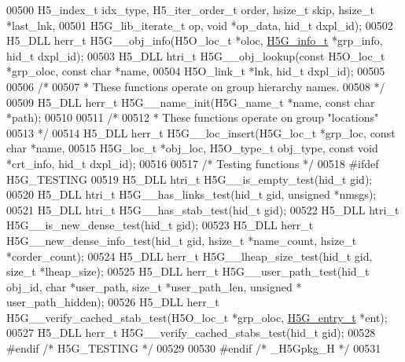 \begin{DoxyCode}
00500     H5\_index\_t idx\_type, H5\_iter\_order\_t order, hsize\_t skip, hsize\_t *last\_lnk,
00501     H5G\_lib\_iterate\_t op, \textcolor{keywordtype}{void} *op\_data, hid\_t dxpl\_id);
00502 H5\_DLL herr\_t H5G\_\_obj\_info(H5O\_loc\_t *oloc, \hyperlink{struct_h5_g__info__t}{H5G\_info\_t} *grp\_info, hid\_t dxpl\_id);
00503 H5\_DLL htri\_t H5G\_\_obj\_lookup(\textcolor{keyword}{const} H5O\_loc\_t *grp\_oloc, \textcolor{keyword}{const} \textcolor{keywordtype}{char} *name,
00504     H5O\_link\_t *lnk, hid\_t dxpl\_id);
00505 
00506 \textcolor{comment}{/*}
00507 \textcolor{comment}{ * These functions operate on group hierarchy names.}
00508 \textcolor{comment}{ */}
00509 H5\_DLL herr\_t H5G\_\_name\_init(H5G\_name\_t *name, \textcolor{keyword}{const} \textcolor{keywordtype}{char} *path);
00510 
00511 \textcolor{comment}{/*}
00512 \textcolor{comment}{ * These functions operate on group "locations"}
00513 \textcolor{comment}{ */}
00514 H5\_DLL herr\_t H5G\_\_loc\_insert(H5G\_loc\_t *grp\_loc, \textcolor{keyword}{const} \textcolor{keywordtype}{char} *name,
00515     H5G\_loc\_t *obj\_loc, H5O\_type\_t obj\_type, \textcolor{keyword}{const} \textcolor{keywordtype}{void} *crt\_info, hid\_t dxpl\_id);
00516 
00517 \textcolor{comment}{/* Testing functions */}
00518 \textcolor{preprocessor}{#ifdef H5G\_TESTING}
00519 H5\_DLL htri\_t H5G\_\_is\_empty\_test(hid\_t gid);
00520 H5\_DLL htri\_t H5G\_\_has\_links\_test(hid\_t gid, \textcolor{keywordtype}{unsigned} *nmsgs);
00521 H5\_DLL htri\_t H5G\_\_has\_stab\_test(hid\_t gid);
00522 H5\_DLL htri\_t H5G\_\_is\_new\_dense\_test(hid\_t gid);
00523 H5\_DLL herr\_t H5G\_\_new\_dense\_info\_test(hid\_t gid, hsize\_t *name\_count, hsize\_t *corder\_count);
00524 H5\_DLL herr\_t H5G\_\_lheap\_size\_test(hid\_t gid, \textcolor{keywordtype}{size\_t} *lheap\_size);
00525 H5\_DLL herr\_t H5G\_\_user\_path\_test(hid\_t obj\_id, \textcolor{keywordtype}{char} *user\_path, \textcolor{keywordtype}{size\_t} *user\_path\_len, \textcolor{keywordtype}{unsigned} *
      user\_path\_hidden);
00526 H5\_DLL herr\_t H5G\_\_verify\_cached\_stab\_test(H5O\_loc\_t *grp\_oloc, \hyperlink{struct_h5_g__entry__t}{H5G\_entry\_t} *ent);
00527 H5\_DLL herr\_t H5G\_\_verify\_cached\_stabs\_test(hid\_t gid);
00528 \textcolor{preprocessor}{#endif }\textcolor{comment}{/* H5G\_TESTING */}\textcolor{preprocessor}{}
00529 
00530 \textcolor{preprocessor}{#endif }\textcolor{comment}{/* \_H5Gpkg\_H */}\textcolor{preprocessor}{}
00531 
\end{DoxyCode}
